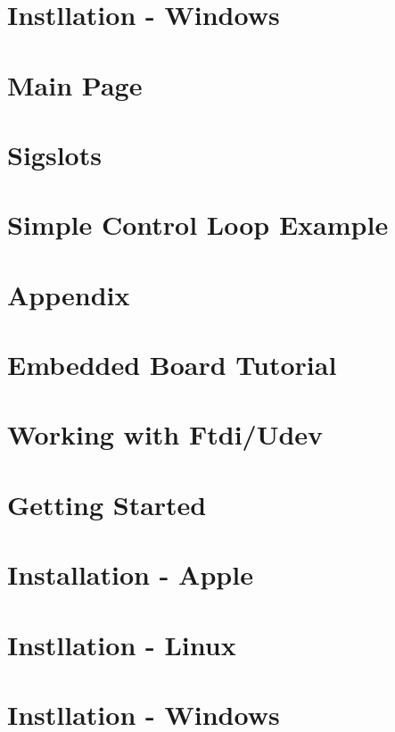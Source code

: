 \documentclass[a4paper]{book}
\begin{document}
\chapter{\-Instllation -\/ \-Windows}
\label{enInstallationWindowsGuide}

\chapter{\-Main \-Page}
\label{enMainPage}

\chapter{\-Sigslots}
\label{enSigslotsGuide}

\chapter{\-Simple \-Control \-Loop \-Example}
\label{enSimpleExample}

\chapter{\-Appendix}
\label{koAppendixGuide}

\chapter{\-Embedded \-Board \-Tutorial}
\label{koEmbeddedBoardTutorial}

\chapter{\-Working with \-Ftdi/\-Udev}
\label{koFtdiGuide}

\chapter{\-Getting \-Started}
\label{koGettingStartedGuide}

\chapter{\-Installation -\/ \-Apple}
\label{enInstallationAppleGuide}

\chapter{\-Instllation -\/ \-Linux}
\label{koInstallationLinuxGuide}

\chapter{\-Instllation -\/ \-Windows}
\label{koInstallationWindowsGuide}

\end{document}
